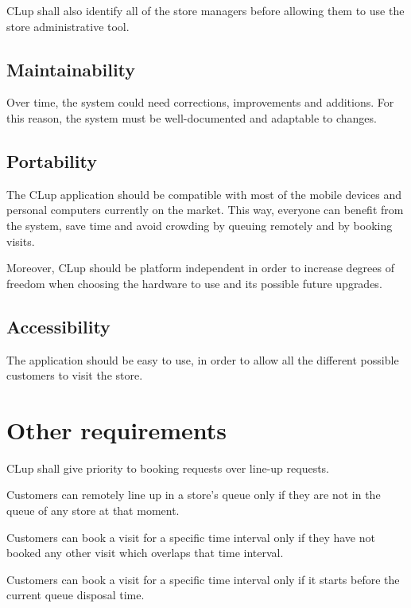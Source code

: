 \documentclass[a4paper,oneside,11pt]{book}   %
\begin{document}
    CLup shall also identify all of the store managers before allowing them to use the store administrative tool.
    
    \subsection{Maintainability}
    Over time, the system could need corrections, improvements and additions. For this reason, the system must be well-documented and adaptable to changes.
    
    \subsection{Portability}
    The CLup application should be compatible with most of the mobile devices and personal computers currently on the market. This way, everyone can benefit from the system, save time and avoid crowding by queuing remotely and by booking visits. \par
    Moreover, CLup should be platform independent in order to increase degrees of freedom when choosing the hardware to use and its possible future upgrades.
    
    \subsection{Accessibility}
    The application should be easy to use, in order to allow all the different possible customers to visit the store.
    
    \section{Other requirements}
    CLup shall give priority to booking requests over line-up requests. \par
    Customers can remotely line up in a store’s queue only if they are not in the queue of any store at that moment. \par
    Customers can book a visit for a specific time interval only if they have not booked any other visit which overlaps that time interval. \par
    Customers can book a visit for a specific time interval only if it starts before the current queue disposal time. 

\listoftables
\listoffigures
\end{document}
